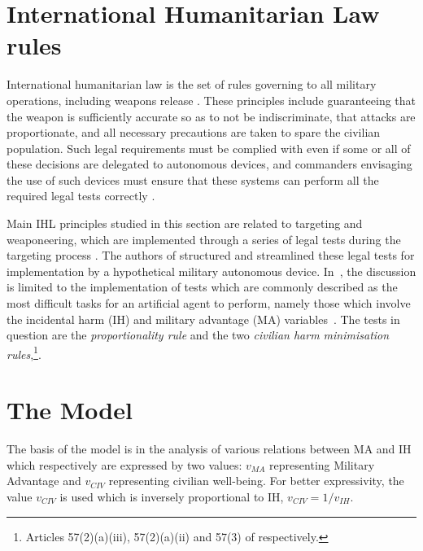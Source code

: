 \section{International Humanitarian Law rules}
\label{sec:ihl_model}
International humanitarian law is the set of rules governing to all military operations, including weapons release \cite{113Fleck}. 
These principles include guaranteeing that the weapon is sufficiently accurate so as to not be indiscriminate, that attacks are proportionate, and all necessary precautions are taken to spare the civilian population. Such legal requirements must be complied with even if some or all of these decisions are delegated to autonomous devices, and commanders envisaging the use of such devices must ensure that these systems can perform all the required legal tests correctly \cite{119BoothbyWEd}.

Main IHL principles studied in this section are related to targeting and weaponeering, which are implemented through a series of legal tests during the targeting process \cite{118DucheinePEtg,120HeineggWInkl,114CornGS}. The authors of \cite{zurek-coine22} structured and streamlined these legal tests for implementation by a hypothetical  military autonomous device. In~\cite{zurek2022jurix}, the discussion is limited to the implementation of tests which are commonly described as the most difficult tasks for an artificial agent to perform, namely those which involve the incidental harm (IH) and military advantage (MA) variables~\cite{119BoothbyWEd}. The tests in question are the \textit{proportionality rule} and the two \textit{civilian harm minimisation rules},\footnote{Articles 57(2)(a)(iii), 57(2)(a)(ii) and 57(3) of \cite{APIz} respectively.}.%
\section{The Model}

The basis of the model is in the analysis of various relations between MA and IH which respectively are expressed by two values: $v_{MA}$ representing Military Advantage and $v_{CIV}$ representing civilian well-being. For better expressivity, the value $v_{CIV}$ is used which is inversely proportional to IH, $v_{CIV} = 1/v_{IH}$.

